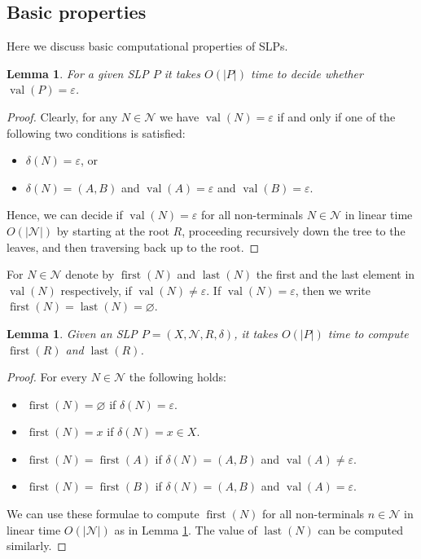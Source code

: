 \documentclass[12pt,oneside]{amsart}
\newtheorem{lemma}[theorem]{Lemma}
\theoremstyle{definition}
\theoremstyle{case}
\def\CN{{\mathcal N}}
\DeclareMathOperator{\first}{{first}}
\DeclareMathOperator{\last}{{last}}
\DeclareMathOperator{\val}{val}
\begin{document}
\subsection{Basic properties}

Here we discuss basic computational properties of SLPs.

\begin{lemma}\label{le:w-trivial}
For a given SLP $P$ it takes $O(|P|)$ time to decide whether $\val(P)=\varepsilon$.
\end{lemma}

\begin{proof}
Clearly, for any $N\in\CN$ we have $\val(N)=\varepsilon$ if and only if
one of the following two conditions is satisfied:
\begin{itemize}
\item
$\delta(N) = \varepsilon$, or
\item
$\delta(N) = (A,B)$ and $\val(A)=\varepsilon$ and $\val(B)=\varepsilon$.
\end{itemize}
Hence, we can decide if $\val(N)=\varepsilon$ 
for all non-terminals $N\in\CN$ in linear time $O(|\CN|)$
by starting at the root 
$R$, proceeding recursively down the tree to the leaves, 
and then traversing back up to the root.
\end{proof}

For $N\in\CN$ denote by $\first(N)$ and $\last(N)$
the first and the last element in $\val(N)$ respectively, if $\val(N)\ne\varepsilon$.
If $\val(N)=\varepsilon$, then we write 
$\first(N)=\last(N)=\varnothing$.


\begin{lemma}\label{le:first-last}
Given an SLP $P=(X,\CN,R,\delta)$, it takes $O(|P|)$ time to compute
$\first(R)$ and $\last(R)$.
\end{lemma}

\begin{proof}
For every $N\in\CN$ the following holds:
\begin{itemize}
\item 
$\first(N)=\varnothing$ if $\delta(N) = \varepsilon$.
\item 
$\first(N)=x$ if $\delta(N)  = x \in X$.
\item 
$\first(N)=\first(A)$  if $\delta(N) = (A,B)$ and $\val(A)\ne\varepsilon$.
\item 
$\first(N)=\first(B)$  if $\delta(N) = (A,B)$ and $\val(A)=\varepsilon$.
\end{itemize}
We can use these formulae to compute
$\first(N)$ for all non-terminals $n\in\CN$ in linear time $O(|\CN|)$
as in Lemma \ref{le:w-trivial}.
The value of $\last(N)$ can be computed similarly.
\end{proof}
\end{document}
